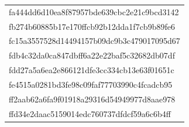 \begin{tabular}{l}
fa444dd6d10ea8f87957bde639cbc2e21c9bcd3142 \\
fb274b60885b17e170ffcb92b12dda1f7cb9b89fe6 \\
fc15a3557528d14494157b09dc9b3c479017095d67 \\
fdb4c32da0ca847dbff6a22e22baf5c32682db07df \\
fdd27a5a6ea2e866121dfe3cc334cb13e63f01651c \\
fe4515a0281bd3fe98c09faf77703990c4fcadcb95 \\
ff2aab62a6fa9f01918a29316d54949977d8aae978 \\
ffd34e2daac5159014edc760737dfdcf59a6c6b4ff \\
\bottomrule
\end{tabular}
